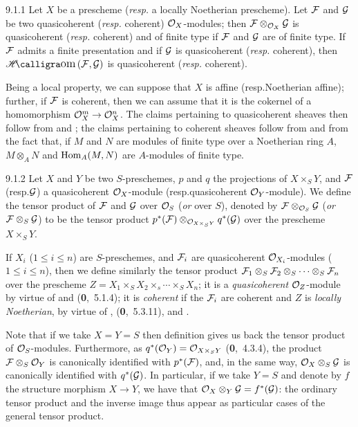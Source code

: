 
\begin{env}[Proposition]{9.1.1}
\label{prop-1.9.1.1}
Let $X$ be a prescheme
(\emph{resp.} a locally Noetherian prescheme). Let $\mathcal{F}$ and $\mathcal{G}$
be two quasicoherent (\emph{resp.} coherent) $\mathcal{O}_X$-modules; then
$\mathcal{F}\otimes_{\mathcal{O}_X}\mathcal{G}$ is quasicoherent (\emph{resp.} coherent) and
of finite type if $\mathcal{F}$ and $\mathcal{G}$ are of finite type. If
$\mathcal{F}$ admits a finite presentation and if $\mathcal{G}$ is quasicoherent
(\emph{resp.} coherent), then $\sheafHom(\sheaf{F},\sheaf{G})$ is quasicoherent
(\emph{resp.} coherent).
\end{env}

Being a local property, we can suppose that $X$ is affine (resp.Noetherian
affine); further, if $\mathcal{F}$ is coherent, then we can assume that it is the
cokernel of a homomorphism $\mathcal{O}_X^m\to\mathcal{O}_X^n$. The claims pertaining to
quasicoherent sheaves then follow from  and ; the
claims pertaining to coherent sheaves follow from  and from the fact
that, if $M$ and $N$ are modules of finite type over a Noetherian ring $A$,
$M\otimes_A N$ and $\operatorname{Hom}_A(M,N)$ are $A$-modules of finite type.

\begin{envr}[Definition]{9.1.2}
\label{defn-1.9.1.2}
Let $X$ and $Y$ be two $S$-preschemes, $p$ and
$q$ the projections of $X\times_S Y$, and $\mathcal{F}$ (resp.$\mathcal{G}$) a
quasicoherent $\mathcal{O}_X$-module (resp.quasicoherent $\mathcal{O}_Y$-module). We define the
tensor product of $\mathcal{F}$ and $\mathcal{G}$ over $\mathcal{O}_S$ (\emph{or} over $S$),
denoted by $\mathcal{F}\otimes_{\mathcal{O}_S}\mathcal{G}$ (\emph{or}
$\mathcal{F}\otimes_S\mathcal{G}$) to be the tensor product
$p^\ast(\mathcal{F})\otimes_{\mathcal{O}_{X\times_S Y}}q^\ast(\mathcal{G})$ over the
prescheme $X\times_S Y$.
\end{envr}

If $X_i$ ($1\leq i\leq n$) are $S$-preschemes, and $\mathcal{F}_i$ are
quasicoherent $\mathcal{O}_{X_i}$-modules ($1\leq i\leq n$), then we define similarly the
tensor product
$\mathcal{F}_1\otimes_S\mathcal{F}_2\otimes_S\cdots\otimes_S\mathcal{F}_n$ over the
prescheme $Z=X_1\times_S X_2\times_s\cdots\times_S X_n$; it is a
\emph{quasicoherent} $\mathcal{O}_Z$-module by virtue of  and
(\textbf{0},~5.1.4); it is \emph{coherent} if the $\mathcal{F}_i$ are coherent and
$Z$ is \emph{locally Noetherian}, by virtue of ,
(\textbf{0},~5.3.11), and .

Note that if we take $X=Y=S$ then definition  gives us back the tensor
product of $\mathcal{O}_S$-modules. Furthermore, as $q^\ast(\mathcal{O}_Y)=\mathcal{O}_{X\times_S Y}$
(\textbf{0},~4.3.4), the product $\mathcal{F}\otimes_S\mathcal{O}_Y$ is canonically
identified with $p^\ast(\mathcal{F})$, and, in the same way,
$\mathcal{O}_X\otimes_S\mathcal{G}$ is canonically identified with $q^\ast(\mathcal{G})$. In
particular, if we take $Y=S$ and denote by $f$ the structure morphism $X\to Y$,
we have that $\mathcal{O}_X\otimes_Y\mathcal{G}=f^\ast(\mathcal{G})$: the ordinary tensor
product and the inverse image thus appear as particular cases of the general
tensor product.


